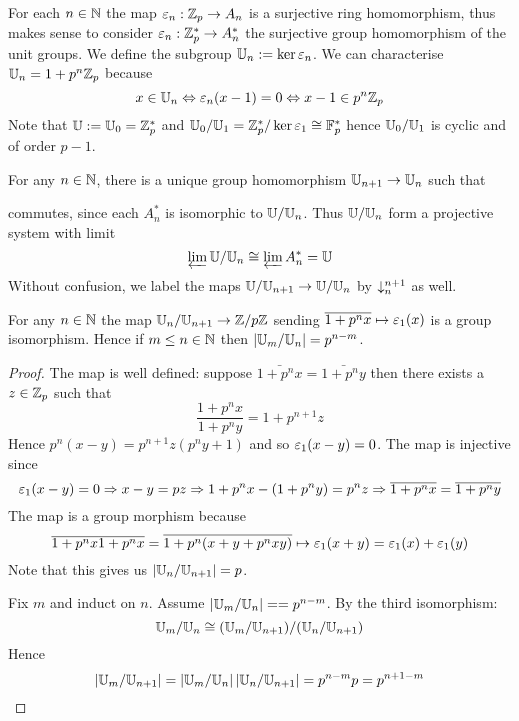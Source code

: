 \begin{dfn}[$\U_n$]
    For each $n \in \mathbb{N}$
    the map $\varepsilon_n: \mathbb{Z}_p \to A_n$ is a surjective ring homomorphism,
    thus makes sense to consider $\varepsilon_n: \mathbb{Z}_p^* \to A_n^*$
    the surjective group homomorphism of the unit groups.
    We define the subgroup $\mathbb{U}_n := \ker \varepsilon_n$.
    We can characterise $\mathbb{U}_n = 1 + p^n \mathbb{Z}_p$ because
    \[x \in \mathbb{U}_n \Leftrightarrow \varepsilon_n(x - 1) = 0 \Leftrightarrow x - 1 \in p^n \mathbb{Z}_p\]
    Note that $\mathbb{U} := \mathbb{U}_0 = \mathbb{Z}_p^*$ and 
    $\mathbb{U}_0 / \mathbb{U}_1 = \mathbb{Z}_p^* / \ker \varepsilon_1 \cong \mathbb{F}_p^*$
    hence $\mathbb{U}_0 / \mathbb{U}_1$ is cyclic and of order $p-1$.
\end{dfn}
\begin{prop}
    For any $n \in \mathbb{N}$, 
    there is a unique group homomorphism 
    $\mathbb{U}_{n+1} \to \mathbb{U}_n$ such that 
    \begin{center}
    \end{center}
    commutes, since each $A_n^*$ is isomorphic to $\mathbb{U} / \mathbb{U}_n$.
    Thus $\mathbb{U} / \mathbb{U}_n$ form a projective system with limit 
    \[\varprojlim \mathbb{U} / \mathbb{U}_n \cong \varprojlim A_n^* = \mathbb{U}\]
    Without confusion, 
    we label the maps $\mathbb{U} / \mathbb{U}_{n + 1} \to \mathbb{U} / \mathbb{U}_n$
    by $\downarrow_{n}^{n+1}$ as well.
\end{prop}

\begin{prop}
    For any $n \in \mathbb{N}$ the map $\mathbb{U}_n / \mathbb{U}_{n+1} \to \mathbb{Z} / p\mathbb{Z}$
    sending $\overline{1 + p^n x} \mapsto \varepsilon_1 (x)$ is a group 
    isomorphism.
    Hence if $m \le n \in \mathbb{N}$ then $\left\vert \mathbb{U}_m / \mathbb{U}_n \right\vert = p^{n-m}$.
\end{prop}
\begin{proof}
    The map is well defined: suppose 
    $\bar{1 + p^n x} = \bar{1 + p^n y}$ then
    there exists a $z \in \mathbb{Z}_p$ such that
    \[\frac{1 + p^n x}{1 + p^n y} = 1 + p^{n+1} z\]
    Hence $p^n(x - y) = p^{n+1} z (p^n y + 1)$ and so 
    $\varepsilon_1(x - y) = 0$.
    The map is injective since 
    \[\varepsilon_1 (x - y) = 0 \Rightarrow x - y = p z 
    \Rightarrow 1 + p^n x - (1 + p^n y) = p^n z
    \Rightarrow \overline{1 + p^n x} = \overline{1 + p^n y}\]
    The map is a group morphism because 
    \[\overline{1 + p^n x}\overline{1 + p^n x} = \overline{1 + p^n (x + y + p^n xy)}
    \mapsto \varepsilon_1(x + y) = \varepsilon_1(x) + \varepsilon_1(y)\]
    Note that this gives us $\left\vert \mathbb{U}_n / \mathbb{U}_{n+1} \right\vert = p$.

    Fix $m$ and induct on $n$. 
    Assume $\left\vert \mathbb{U}_m / \mathbb{U}_n \right\vert = = p^{n-m}$.
    By the third isomorphism:
    \[{\mathbb{U}_m / \mathbb{U}_n} \cong (\mathbb{U}_m / \mathbb{U}_{n+1}) / (\mathbb{U}_n / \mathbb{U}_{n+1})\]
    Hence 
    \[\left\vert \mathbb{U}_m / \mathbb{U}_{n+1} \right\vert = 
    \left\vert \mathbb{U}_m / \mathbb{U}_n \right\vert \left\vert \mathbb{U}_n / \mathbb{U}_{n+1} \right\vert = p^{n-m} p = p^{n + 1 - m}\]
\end{proof}

